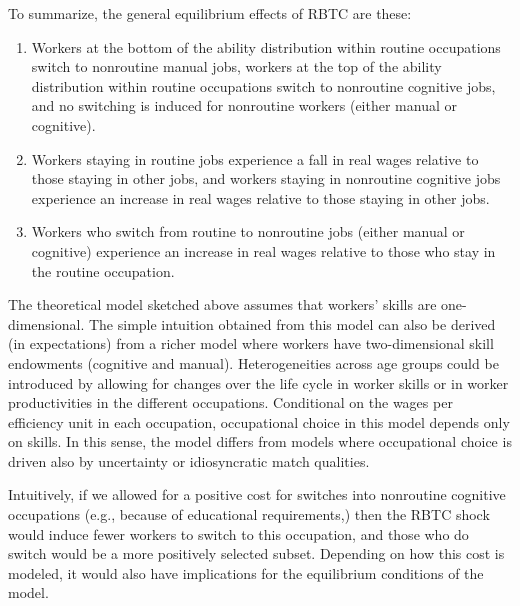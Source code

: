 \documentclass[12pt]{article}
\newcommand{\highlightR}[1]{{\emph{\color{MyRed}{#1}}}}
\newcommand{\highlightO}[1]{{\emph{\color{MyOrange}{#1}}}}
\theoremstyle{definition}
\begin{document}
To summarize, the general equilibrium effects of RBTC are these: 
\begin{enumerate}[topsep=0pt, leftmargin=20pt, itemsep=0pt, label=(\arabic*)]
    \setlength{\parskip}{10pt} 
    \item Workers at the bottom of the ability distribution within routine occupations switch to nonroutine manual jobs, workers at the top of the ability distribution within routine occupations switch to nonroutine cognitive jobs, and no switching is induced for nonroutine workers (either manual or cognitive).
    \item Workers staying in routine jobs experience a fall in real wages relative to those staying in other jobs, and workers staying in nonroutine cognitive jobs experience an increase in real wages relative to those staying in other jobs.
    \item Workers who switch from routine to nonroutine jobs (either manual or cognitive) experience an increase in real wages relative to those who stay in the routine occupation.
\end{enumerate}

\highlightR{WWZ Notes: The implications are derived by settings which initially imply that routine-biased technical change increases relative wage of nonroutine cognitive occupations while decreases relative wage of routine occupations.}

The theoretical model sketched above assumes that workers' skills are one-dimensional. The simple intuition obtained from this model can also be derived (in expectations) from a richer model where workers have two-dimensional skill endowments (cognitive and manual). Heterogeneities across age groups could be introduced by allowing for changes over the life cycle in worker skills or in worker productivities in the different occupations. Conditional on the wages per efficiency unit in each occupation, occupational choice in this model depends only on skills. In this sense, the model differs from models where occupational choice is driven also by uncertainty or idiosyncratic match qualities. 

\highlightO{Another abstraction made by the model is that it assumes that there is no cost to switching occupations.} Intuitively, if we allowed for a positive cost for switches into nonroutine cognitive occupations (e.g., because of educational requirements,) then the RBTC shock would induce fewer workers to switch to this occupation, and those who do switch would be a more positively selected subset. Depending on how this cost is modeled, it would also have implications for the equilibrium conditions of the model. 
\end{document}
